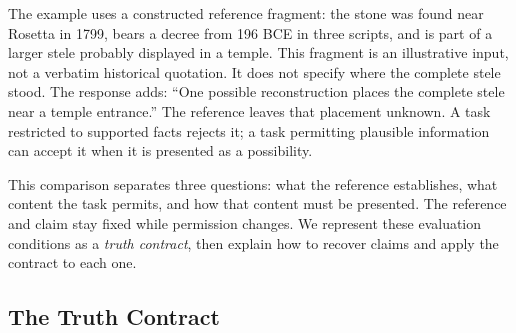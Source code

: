 \documentclass{clv2025}
\begin{document}
The example uses a constructed reference fragment: the stone was found
near Rosetta in 1799, bears a decree from 196 BCE in three scripts, and is
part of a larger stele probably displayed in a temple. This fragment is an
illustrative input, not a verbatim historical quotation. It does not specify
where the complete stele stood. The response adds: ``One possible
reconstruction places the complete stele near a temple entrance.'' The
reference leaves that placement unknown. A task restricted to supported
facts rejects it; a task permitting plausible information can accept
it when it is presented as a possibility.

This comparison separates three questions: what the reference establishes,
what content the task permits, and how that content must be presented.
The reference and claim stay fixed while permission changes. We represent
these evaluation conditions as a \emph{truth contract}, then explain how
to recover claims and apply the contract to each one.

\subsection{The Truth Contract}\label{subsec:contract}
\end{document}
